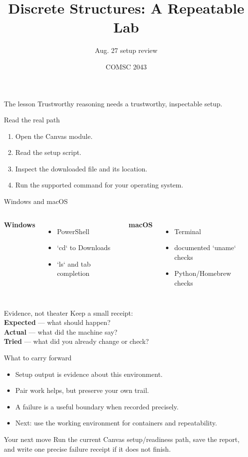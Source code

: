 \documentclass[aspectratio=169,10pt]{beamer}
\title{Discrete Structures: A Repeatable Lab}
\subtitle{Aug. 27 setup review}
\author{COMSC 2043}
\date{}
\begin{document}
\frame{\titlepage}
\begin{frame}{The lesson}{\Large\centering
Trustworthy reasoning needs a trustworthy, inspectable setup.}
\end{frame}
\begin{frame}{Read the real path}
\begin{enumerate}\item Open the Canvas module.\item Read the setup script.\item Inspect the downloaded file and its location.\item Run the supported command for your operating system.\end{enumerate}
\end{frame}
\begin{frame}{Windows and macOS}
\begin{columns}\textbf{Windows}\begin{itemize}\item PowerShell\item `cd` to Downloads\item `ls` and tab completion\end{itemize}\textbf{macOS}\begin{itemize}\item Terminal\item documented `uname` checks\item Python/Homebrew checks\end{itemize}\end{columns}
\end{frame}
\begin{frame}{Evidence, not theater}
Keep a small receipt:\\[.5em]
\textbf{Expected} — what should happen?\\
\textbf{Actual} — what did the machine say?\\
\textbf{Tried} — what did you already change or check?
\end{frame}
\begin{frame}{What to carry forward}
\begin{itemize}\item Setup output is evidence about this environment.\item Pair work helps, but preserve your own trail.\item A failure is a useful boundary when recorded precisely.\item Next: use the working environment for containers and repeatability.\end{itemize}
\end{frame}
\begin{frame}{Your next move}
Run the current Canvas setup/readiness path, save the report, and write one precise failure receipt if it does not finish.
\end{frame}
\end{document}
